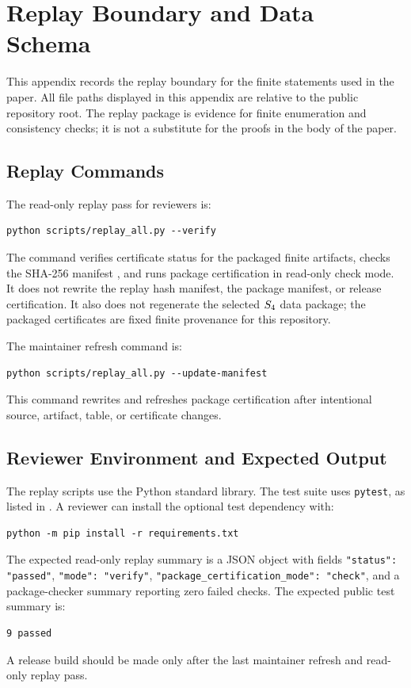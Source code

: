 \section{Replay Boundary and Data Schema}
\label{app:replay-schema}

This appendix records the replay boundary for the finite statements used in the paper. All file paths displayed in this appendix are relative to the public repository root. The replay package is evidence for finite enumeration and consistency checks; it is not a substitute for the proofs in the body of the paper.

\subsection{Replay Commands}
\label{app:replay-command}

The read-only replay pass for reviewers is:
\begin{verbatim}
python scripts/replay_all.py --verify
\end{verbatim}
The command verifies certificate status for the packaged finite artifacts, checks the SHA-256 manifest , and runs package certification in read-only check mode. It does not rewrite the replay hash manifest, the package manifest, or release certification. It also does not regenerate the selected \(S_4\) data package; the packaged certificates are fixed finite provenance for this repository.

The maintainer refresh command is:
\begin{verbatim}
python scripts/replay_all.py --update-manifest
\end{verbatim}
This command rewrites  and refreshes package certification after intentional source, artifact, table, or certificate changes.
\subsection{Reviewer Environment and Expected Output}
\label{app:reviewer-environment}

The replay scripts use the Python standard library. The test suite uses \texttt{pytest}, as listed in . A reviewer can install the optional test dependency with:
\begin{verbatim}
python -m pip install -r requirements.txt
\end{verbatim}
The expected read-only replay summary is a JSON object with fields \verb|"status": "passed"|, \verb|"mode": "verify"|, \verb|"package_certification_mode": "check"|, and a package-checker summary reporting zero failed checks. The expected public test summary is:
\begin{verbatim}
9 passed
\end{verbatim}
A release build should be made only after the last maintainer refresh and read-only replay pass.

